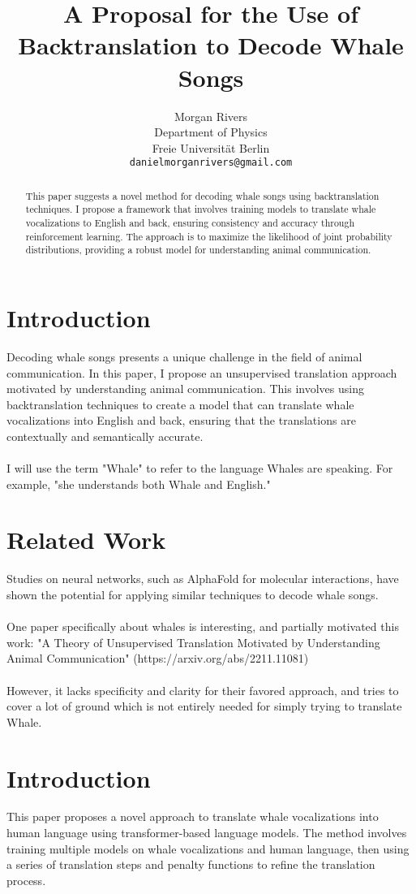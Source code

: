 \documentclass{article}
\title{A Proposal for the Use of Backtranslation to Decode Whale Songs}
\author{Morgan Rivers \\
        Department of Physics \\
        Freie Universität Berlin \\    
        \texttt{danielmorganrivers@gmail.com}
}
\begin{document}
\maketitle

\begin{abstract}
This paper suggests a novel method for decoding whale songs using backtranslation techniques. I propose a framework that involves training models to translate whale vocalizations to English and back, ensuring consistency and accuracy through reinforcement learning. The approach is to maximize the likelihood of joint probability distributions, providing a robust model for understanding animal communication.
\end{abstract}

\section{Introduction}
Decoding whale songs presents a unique challenge in the field of animal communication. In this paper, I propose an unsupervised translation approach motivated by understanding animal communication. This involves using backtranslation techniques to create a model that can translate whale vocalizations into English and back, ensuring that the translations are contextually and semantically accurate.\\ \\
I will use the term "Whale" to refer to the language Whales are speaking. For example, "she understands both Whale and English."

\section{Related Work}
Studies on neural networks, such as AlphaFold for molecular interactions, have shown the potential for applying similar techniques to decode whale songs. \\ \\
One paper specifically about whales is interesting, and partially motivated this work:
"A Theory of Unsupervised Translation Motivated by Understanding Animal Communication" (https://arxiv.org/abs/2211.11081) \\ \\
However, it lacks specificity and clarity for their favored approach, and tries to cover a lot of ground which is not entirely needed for simply trying to translate Whale.


\section{Introduction}
This paper proposes a novel approach to translate whale vocalizations into human language using transformer-based language models. The method involves training multiple models on whale vocalizations and human language, then using a series of translation steps and penalty functions to refine the translation process.
\end{document}
